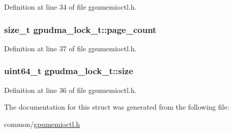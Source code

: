Definition at line 34 of file gpumemioctl.h.\hypertarget{structgpudma__lock__t_a7a5449281d51204ac90b1b6803004784}{
\subsubsection[{page\_\-count}]{\setlength{\rightskip}{0pt plus 5cm}size\_\-t {\bf gpudma\_\-lock\_\-t::page\_\-count}}}
\label{structgpudma__lock__t_a7a5449281d51204ac90b1b6803004784}


Definition at line 37 of file gpumemioctl.h.\hypertarget{structgpudma__lock__t_a7c3c9d36171da51b60208422084474a7}{
\subsubsection[{size}]{\setlength{\rightskip}{0pt plus 5cm}uint64\_\-t {\bf gpudma\_\-lock\_\-t::size}}}
\label{structgpudma__lock__t_a7c3c9d36171da51b60208422084474a7}


Definition at line 36 of file gpumemioctl.h.

The documentation for this struct was generated from the following file:\begin{DoxyCompactItemize}
\item 
common/\hyperlink{gpumemioctl_8h}{gpumemioctl.h}\end{DoxyCompactItemize}
